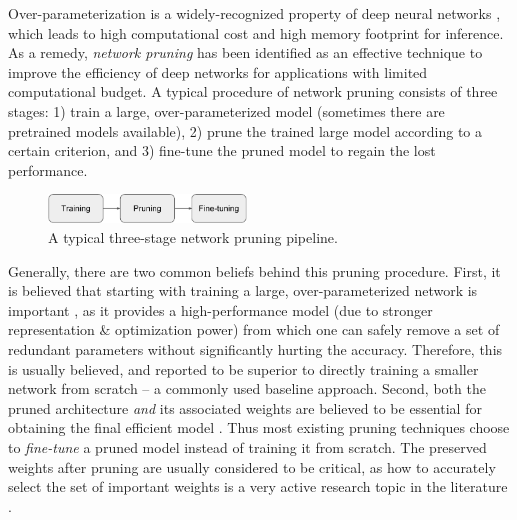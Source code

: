 Over-parameterization is a widely-recognized property of deep neural networks \citep{lowrank1, deep}, which leads to high computational cost and high memory footprint for inference. As a remedy, \emph{network pruning} \citep{obd,obs,han2015learning, nvidia, li2016pruning} has been identified as an effective technique to improve the  efficiency of deep networks for applications with limited computational budget. A typical procedure of network pruning consists of three stages: 1) train a large, over-parameterized model (sometimes there are pretrained models available), 2) prune the trained large model according to a certain criterion, and 3) fine-tune the pruned model to regain the lost performance.

\begin{figure}
  \begin{center}
  \vspace{-5pt}
    \includegraphics[width=0.47\textwidth]{figures/fig1_pipeline-crop.pdf}
  \end{center}
\caption{A typical three-stage network pruning pipeline.}
    \label{fig1}
    \vspace{-5pt}
\end{figure}

Generally, there are two common beliefs behind this pruning procedure. First, it is believed that starting with training a large, over-parameterized network is important \citep{luo2017thinet,carreira2018learning}, as it provides a high-performance model (due to stronger representation \& optimization power) from which one can safely remove a set of redundant parameters without significantly hurting the accuracy. Therefore, this is usually believed, and reported to be superior to directly training a smaller network from scratch \citep{li2016pruning,luo2017thinet,he2017channel,nisp} -- a commonly used baseline approach.   
Second, both the pruned architecture \emph{and} its associated weights are believed to be essential for obtaining the final efficient model \citep{han2015learning}. Thus most existing pruning techniques choose to \emph{fine-tune} a pruned model instead of training it from scratch. The preserved weights after pruning are usually considered to be critical, as how to accurately select the set of important weights is a very active research topic in the literature \citep{nvidia,li2016pruning,luo2017thinet, he2017channel, liu2017learning,pfa}.



